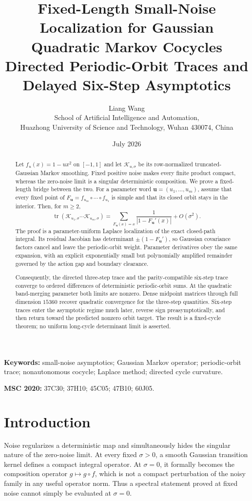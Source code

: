 \documentclass[11pt]{article}
\title{Fixed-Length Small-Noise Localization for Gaussian Quadratic Markov Cocycles\\
\large Directed Periodic-Orbit Traces and Delayed Six-Step Asymptotics}
\author{Liang Wang\\
\small School of Artificial Intelligence and Automation,\\[-0.2em]
\small Huazhong University of Science and Technology, Wuhan 430074, China}
\date{July 2026}
\theoremstyle{remark}
\DeclareMathOperator{\tr}{tr}
\newcommand{\cK}{\mathcal K}
\newcommand{\bu}{\boldsymbol u}
\begin{document}
\maketitle

\begin{abstract}
Let $f_u(x)=1-u x^2$ on $[-1,1]$ and let $\cK_{u,\sigma}$ be its
row-normalized truncated-Gaussian Markov smoothing.  Fixed positive noise
makes every finite product compact, whereas the zero-noise limit is a
singular deterministic composition.  We prove a fixed-length bridge between
the two.  For a parameter word $\bu=(u_1,\ldots,u_m)$, assume that every fixed
point of $F_{\bu}=f_{u_m}\circ\cdots\circ f_{u_1}$ is simple and that its
closed orbit stays in the interior.  Then, for $m\ge2$,
\[
 \tr(\cK_{u_1,\sigma}\cdots\cK_{u_m,\sigma})
 =\sum_{F_{\bu}(x)=x}\frac1{|1-F_{\bu}'(x)|}+O(\sigma^2).
\]
The proof is a parameter-uniform Laplace localization of the exact closed-path
integral.  Its residual Jacobian has determinant
$\pm(1-F_{\bu}')$, so Gaussian covariance factors cancel and leave the
periodic-orbit weight.  Parameter derivatives obey the same expansion, with
an explicit exponentially small but polynomially amplified remainder governed
by the action gap and boundary clearance.

Consequently, the directed three-step trace and the parity-compatible
six-step trace converge to ordered differences of deterministic periodic-orbit
sums.  At the quadratic band-merging parameter both limits are nonzero.  Dense
midpoint matrices through full dimension $15360$ recover quadratic convergence
for the three-step quantities.  Six-step traces enter the asymptotic regime
much later, reverse sign preasymptotically, and then return toward the predicted
nonzero orbit target.  The result is a fixed-cycle theorem; no uniform
long-cycle determinant limit is asserted.
\end{abstract}

\noindent\textbf{Keywords:}
small-noise asymptotics; Gaussian Markov operator; periodic-orbit trace;
nonautonomous cocycle; Laplace method; directed cycle curvature.

\noindent\textbf{MSC 2020:}
37C30; 37H10; 45C05; 47B10; 60J05.

\section{Introduction}

Noise regularizes a deterministic map and simultaneously hides the singular
nature of the zero-noise limit.  At every fixed $\sigma>0$, a smooth Gaussian
transition kernel defines a compact integral operator.  At $\sigma=0$, it
formally becomes the composition operator $g\mapsto g\circ f$, which is not a
compact perturbation of the noisy family in any useful operator norm.  Thus a
spectral statement proved at fixed noise cannot simply be evaluated at
$\sigma=0$.
\end{document}
